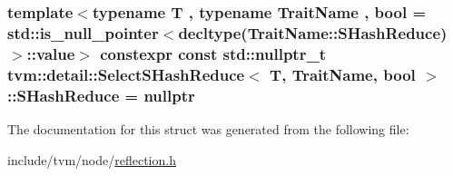 \subsubsection[{\texorpdfstring{S\+Hash\+Reduce}{SHashReduce}}]{\setlength{\rightskip}{0pt plus 5cm}template$<$typename T , typename Trait\+Name , bool  = std\+::is\+\_\+null\+\_\+pointer$<$decltype(\+Trait\+Name\+::\+S\+Hash\+Reduce)$>$\+::value$>$ constexpr const std\+::nullptr\+\_\+t {\bf tvm\+::detail\+::\+Select\+S\+Hash\+Reduce}$<$ T, Trait\+Name, bool $>$\+::S\+Hash\+Reduce = nullptr\hspace{0.3cm}{\ttfamily [static]}}\hypertarget{structtvm_1_1detail_1_1SelectSHashReduce_a15d1f727168445c18ee9d30fa37084cb}{}\label{structtvm_1_1detail_1_1SelectSHashReduce_a15d1f727168445c18ee9d30fa37084cb}


The documentation for this struct was generated from the following file\+:\begin{DoxyCompactItemize}
\item 
include/tvm/node/\hyperlink{reflection_8h}{reflection.\+h}\end{DoxyCompactItemize}
